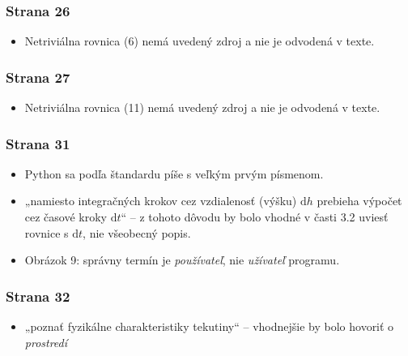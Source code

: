 \hypertarget{strana-26}{%
\subsubsection{Strana 26}\label{strana-26}}

\begin{itemize}
\tightlist
\item
  Netriviálna rovnica (6) nemá uvedený zdroj a nie je odvodená v texte.
\end{itemize}

\hypertarget{strana-27}{%
\subsubsection{Strana 27}\label{strana-27}}

\begin{itemize}
\tightlist
\item
  Netriviálna rovnica (11) nemá uvedený zdroj a nie je odvodená v texte.
\end{itemize}

\hypertarget{strana-31}{%
\subsubsection{Strana 31}\label{strana-31}}

\begin{itemize}
\tightlist
\item
  Python sa podľa štandardu píše s veľkým prvým písmenom.
\item
  „namiesto integračných krokov cez vzdialenosť (výšku) \(\mathrm{d}h\)
  prebieha výpočet cez časové kroky \(\mathrm{d}t\)“ -- z tohoto dôvodu
  by bolo vhodné v časti 3.2 uviesť rovnice s \(\mathrm{d}t\), nie
  všeobecný popis.
\item
  Obrázok 9: správny termín je \emph{používateľ}, nie \emph{užívateľ}
  programu.
\end{itemize}

\hypertarget{strana-32}{%
\subsubsection{Strana 32}\label{strana-32}}

\begin{itemize}
\tightlist
\item
  „poznať fyzikálne charakteristiky tekutiny“ -- vhodnejšie by bolo
  hovoriť o \emph{prostredí}
\end{itemize}

